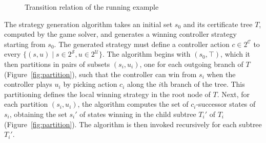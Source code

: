 
\begin{figure}
    \centering
    \caption{Transition relation of the running example}
    \label{fig:stratExample}
\end{figure}

The strategy generation algorithm takes an initial set $s_0$ and its certificate tree $T$, computed by the game solver, and generates a winning controller strategy starting from $s_0$. The generated strategy must define a controller action $c \in 2^{\mathcal{C}}$ to every $\{ (s, u) \mid s \in 2^{\mathcal{S}}, u \in 2^{\mathcal{U}} \}$. The algorithm begins with $(s_0, \top)$, which it then partitions in pairs of subsets $(s_i, u_i)$, one for each outgoing branch of $T$ (Figure~\ref{fig:partition}), such that the controller can win from $s_i$ when the controller plays $u_i$ by picking action $c_i$ along the $i$th branch of the tree.  This partitioning defines the local winning strategy in the root node of $T$.  Next, for each partition $(s_i, u_i)$, the algorithm computes the set of $c_i$-successor states of $s_i$, obtaining the set $s_i'$ of states winning in the child subtree $T_i'$ of $T_i$ (Figure~\ref{fig:partition}).  The algorithm is then invoked recursively for each subtree $T_i'$.

